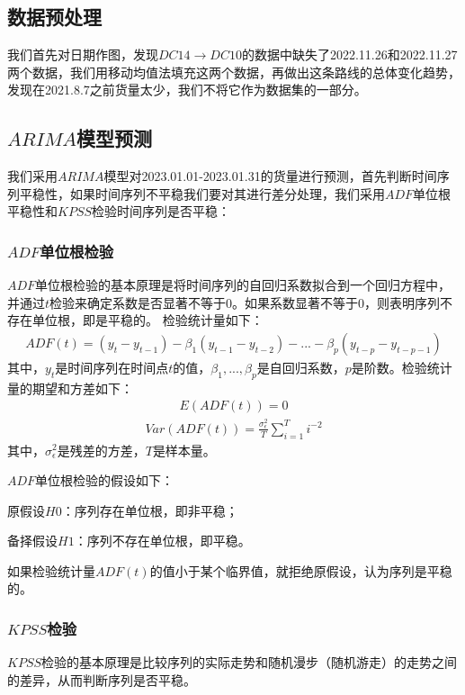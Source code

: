 \documentclass{MathorCupmodeling}
\begin{document}
	\subsection{数据预处理}
我们首先对日期作图，发现$DC14\to DC10$的数据中缺失了2022.11.26和2022.11.27两个数据，我们用移动均值法填充这两个数据，再做出这条路线的总体变化趋势，发现在2021.8.7之前货量太少，我们不将它作为数据集的一部分。

\subsection{$ARIMA$模型预测}
我们采用$ARIMA$模型对2023.01.01-2023.01.31的货量进行预测，首先判断时间序列平稳性，如果时间序列不平稳我们要对其进行差分处理，我们采用$ADF$单位根平稳性和$KPSS$检验时间序列是否平稳：
\subsubsection{$ADF$单位根检验}
$ADF$单位根检验的基本原理是将时间序列的自回归系数拟合到一个回归方程中，并通过$t$检验来确定系数是否显著不等于0。如果系数显著不等于0，则表明序列不存在单位根，即是平稳的。
检验统计量如下：
\begin{eqnarray}
ADF(t) = (y_t - y_{t-1}) - \beta_1 (y_{t-1} - y_{t-2}) - ... - \beta_p (y_{t-p} - y_{t-p-1})
\end{eqnarray}
其中，$y_t$是时间序列在时间点$t$的值，$\beta_1, ..., \beta_p$是自回归系数，$p$是阶数。检验统计量的期望和方差如下：
\begin{eqnarray}
E(ADF(t)) = 0
\end{eqnarray}
\begin{eqnarray}
Var(ADF(t)) = \frac{\sigma_{\epsilon}^2}{T} \sum_{i=1}^T i^{-2}
\end{eqnarray}
其中，$\sigma_{\epsilon}^2$是残差的方差，$T$是样本量。

$ADF$单位根检验的假设如下：

\begin{center}
原假设$ H0$：序列存在单位根，即非平稳；

备择假设$H1$：序列不存在单位根，即平稳。
\end{center}

如果检验统计量$ADF(t)$的值小于某个临界值，就拒绝原假设，认为序列是平稳的。
\subsubsection{$KPSS$检验}
$KPSS$检验的基本原理是比较序列的实际走势和随机漫步（随机游走）的走势之间的差异，从而判断序列是否平稳。
\end{document}
